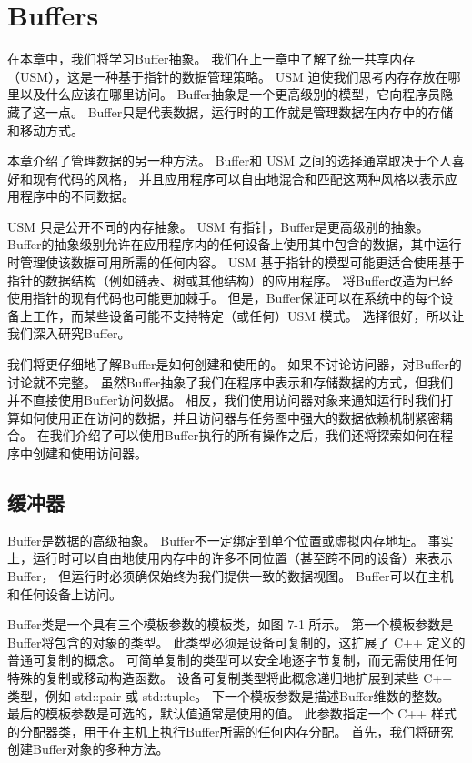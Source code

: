 \section{Buffers}
在本章中，我们将学习Buffer抽象。 我们在上一章中了解了统一共享内存（USM），这是一种基于指针的数据管理策略。 
USM 迫使我们思考内存存放在哪里以及什么应该在哪里访问。 Buffer抽象是一个更高级别的模型，它向程序员隐藏了这一点。 
Buffer只是代表数据，运行时的工作就是管理数据在内存中的存储和移动方式。

本章介绍了管理数据的另一种方法。 Buffer和 USM 之间的选择通常取决于个人喜好和现有代码的风格，
并且应用程序可以自由地混合和匹配这两种风格以表示应用程序中的不同数据。

USM 只是公开不同的内存抽象。 USM 有指针，Buffer是更高级别的抽象。 
Buffer的抽象级别允许在应用程序内的任何设备上使用其中包含的数据，其中运行时管理使该数据可用所需的任何内容。 
USM 基于指针的模型可能更适合使用基于指针的数据结构（例如链表、树或其他结构）的应用程序。 
将Buffer改造为已经使用指针的现有代码也可能更加棘手。 
但是，Buffer保证可以在系统中的每个设备上工作，而某些设备可能不支持特定（或任何）USM 模式。 
选择很好，所以让我们深入研究Buffer。

我们将更仔细地了解Buffer是如何创建和使用的。 如果不讨论访问器，对Buffer的讨论就不完整。 
虽然Buffer抽象了我们在程序中表示和存储数据的方式，但我们并不直接使用Buffer访问数据。 
相反，我们使用访问器对象来通知运行时我们打算如何使用正在访问的数据，并且访问器与任务图中强大的数据依赖机制紧密耦合。 
在我们介绍了可以使用Buffer执行的所有操作之后，我们还将探索如何在程序中创建和使用访问器。


\subsection{缓冲器}
Buffer是数据的高级抽象。 Buffer不一定绑定到单个位置或虚拟内存地址。 
事实上，运行时可以自由地使用内存中的许多不同位置（甚至跨不同的设备）来表示Buffer，
但运行时必须确保始终为我们提供一致的数据视图。 Buffer可以在主机和任何设备上访问。

Buffer类是一个具有三个模板参数的模板类，如图 7-1 所示。 第一个模板参数是Buffer将包含的对象的类型。 
此类型必须是设备可复制的，这扩展了 C++ 定义的普通可复制的概念。 
可简单复制的类型可以安全地逐字节复制，而无需使用任何特殊的复制或移动构造函数。 
设备可复制类型将此概念递归地扩展到某些 C++ 类型，例如 std::pair 或 std::tuple。 
下一个模板参数是描述Buffer维数的整数。 最后的模板参数是可选的，默认值通常是使用的值。 
此参数指定一个 C++ 样式的分配器类，用于在主机上执行Buffer所需的任何内存分配。 
首先，我们将研究创建Buffer对象的多种方法。

